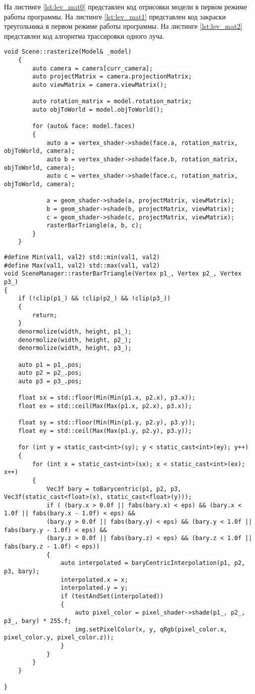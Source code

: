 На листинге \ref{lst:lev_mat0} представлен код отрисовки модели в первом режиме работы программы.
На листинге  \ref{lst:lev_mat1} представлен код закраски треугольника в первом режиме работы программы.
На листинге \ref{lst:lev_mat2} представлен код алгоритма трассировки одного луча.
\begin{lstlisting}[label=lst:lev_mat0,caption= Отрисовка модели в первом режиме работы программы]
	void Scene::rasterize(Model& _model)
	{
		auto camera = camers[curr_camera];
		auto projectMatrix = camera.projectionMatrix;
		auto viewMatrix = camera.viewMatrix();
		
		auto rotation_matrix = model.rotation_matrix;
		auto objToWorld = model.objToWorld();
		
		for (auto& face: model.faces)
		{
			auto a = vertex_shader->shade(face.a, rotation_matrix, objToWorld, camera);
			auto b = vertex_shader->shade(face.b, rotation_matrix, objToWorld, camera);
			auto c = vertex_shader->shade(face.c, rotation_matrix, objToWorld, camera);
			
			a = geom_shader->shade(a, projectMatrix, viewMatrix);
			b = geom_shader->shade(b, projectMatrix, viewMatrix);
			c = geom_shader->shade(c, projectMatrix, viewMatrix);
			rasterBarTriangle(a, b, c);
		}
	}
\end{lstlisting}

\begin{lstlisting}[label=lst:lev_mat1,caption= Закраски треугольника]
#define Min(val1, val2) std::min(val1, val2)
#define Max(val1, val2) std::max(val1, val2)
void SceneManager::rasterBarTriangle(Vertex p1_, Vertex p2_, Vertex p3_)
{
	if (!clip(p1_) && !clip(p2_) && !clip(p3_))
	{
		return;
	}
	denormolize(width, height, p1_);
	denormolize(width, height, p2_);
	denormolize(width, height, p3_);
	
	auto p1 = p1_.pos;
	auto p2 = p2_.pos;
	auto p3 = p3_.pos;
	
	float sx = std::floor(Min(Min(p1.x, p2.x), p3.x));
	float ex = std::ceil(Max(Max(p1.x, p2.x), p3.x));
	
	float sy = std::floor(Min(Min(p1.y, p2.y), p3.y));
	float ey = std::ceil(Max(Max(p1.y, p2.y), p3.y));
	
	for (int y = static_cast<int>(sy); y < static_cast<int>(ey); y++)
	{
		for (int x = static_cast<int>(sx); x < static_cast<int>(ex); x++)
		{
			Vec3f bary = toBarycentric(p1, p2, p3, Vec3f(static_cast<float>(x), static_cast<float>(y)));
			if ( (bary.x > 0.0f || fabs(bary.x) < eps) && (bary.x < 1.0f || fabs(bary.x - 1.0f) < eps) &&
			(bary.y > 0.0f || fabs(bary.y) < eps) && (bary.y < 1.0f || fabs(bary.y - 1.0f) < eps) &&
			(bary.z > 0.0f || fabs(bary.z) < eps) && (bary.z < 1.0f || fabs(bary.z - 1.0f) < eps))
			{
				auto interpolated = baryCentricInterpolation(p1, p2, p3, bary);
				interpolated.x = x;
				interpolated.y = y;
				if (testAndSet(interpolated))
				{
					auto pixel_color = pixel_shader->shade(p1_, p2_, p3_, bary) * 255.f;
					img.setPixelColor(x, y, qRgb(pixel_color.x, pixel_color.y, pixel_color.z));
				}
			}
		}
	}
	
}
\end{lstlisting}

